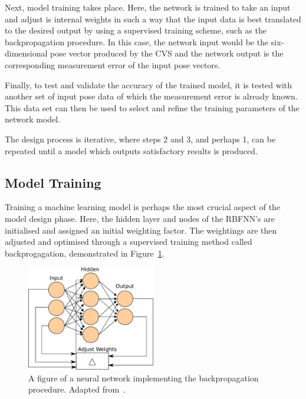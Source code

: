 Next, model training takes place. Here, the network is trained to take an input and adjust is internal weights in such a way that the input data is best translated to the desired output by using a supervised training scheme, such as the backpropagation procedure. In this case, the network input would be the six-dimensional pose vector produced by the CVS and the network output is the corresponding measurement error of the input pose vectors.  

Finally, to test and validate the accuracy of the trained model, it is tested with another set of input pose data of which the measurement error is already known. This data set can then be used to select and refine the training parameters of the network model. 

The design process is iterative, where steps 2 and 3, and perhaps 1, can be repeated until a model which outputs satisfactory results is produced. 

\subsection{Model Training}

Training a machine learning model is perhaps the most crucial aspect of the model design phase. Here, the hidden layer and nodes of the RBFNN's are initialised and assigned an initial weighting factor. The weightings are then adjusted and optimised through a supervised training method called backprogagation, demonstrated in Figure~\ref{fig:chap4-backprogagation}.

\begin{figure}
  \centering
  \includegraphics[width=0.5\textwidth]{figures/chapter4/backpropagation}
  \caption[A neural network implementing the backpropagation procedure.]{A figure of a neural network implementing the backpropagation procedure. Adapted from~\cite{ann-wiki-pic}.}
\label{fig:chap4-backprogagation}
\end{figure}

